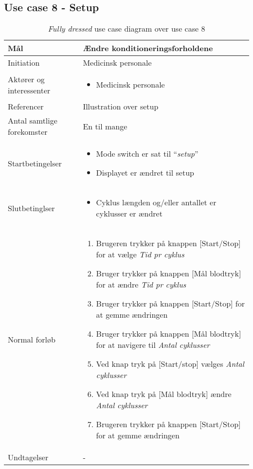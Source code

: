 	\subsection{Use case 8 - Setup}
		\begin{table}[H]
				\begin{center}
			\begin{tabular}{ | p{} | p{}| } 
				\hline
				Mål & Ændre konditioneringsforholdene \\ 
				\hline
				Initiation &  Medicinsk personale\\
				\hline
				Aktører og interessenter & 
				\begin{itemize}
					\item Medicinsk personale 
				\end{itemize} \\ 
				\hline
				Referencer & Illustration over setup \\ 
				\hline
				Antal samtlige forekomster & En til mange \\ 
				\hline	
				Startbetingelser & 
				\begin{itemize}
					\item Mode switch er sat til “\textit{setup}” 
					\item Displayet er ændret til setup
 				\end{itemize} \\ 
				\hline
				Slutbetinglser & 
				\begin{itemize}
					\item Cyklus længden og/eller antallet er cyklusser er ændret
				\end{itemize} \\ 
				\hline
				Normal forløb & \begin{enumerate}
					\setlength\itemsep{0cm} %
					\item Brugeren trykker på knappen [Start/Stop] for at vælge \textit{Tid pr cyklus}
					\item Bruger trykker på knappen [Mål blodtryk] for at ændre \textit{Tid pr cyklus}
					\item Bruger trykker på knappen [Start/Stop] for at gemme ændringen
					\item Bruger trykker på knappen [Mål blodtryk] for at navigere til \textit{Antal cyklusser}
					\item Ved knap tryk på [Start/stop] vælges \textit{Antal cyklusser}
					\item Ved knap tryk på [Mål blodtryk] ændre \textit{Antal cyklusser}
					\item Brugeren trykker på knappen [Start/Stop] for at gemme ændringen
				\end{enumerate} \\ 
				\hline
				Undtagelser & -  \\ 
				\hline
			\end{tabular}
		\end{center}

			\caption{\textit{Fully dressed} use case diagram over use case 8}
		\end{table}
			\newpage
